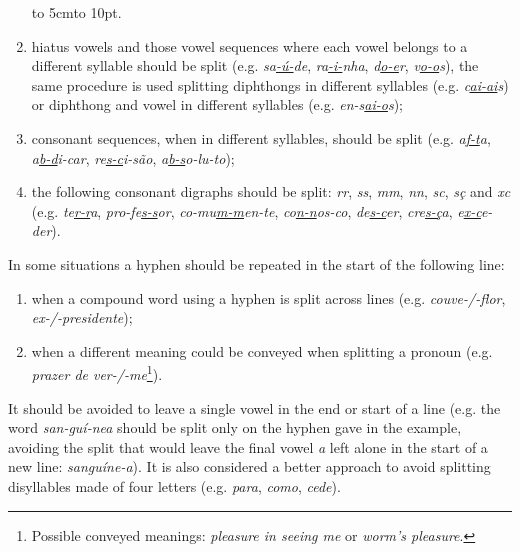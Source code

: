 \documentclass{article}
\begin{document}
\begin{enumerate}
    \hspace{10em} \hbox to 5cm{\leaders\hbox to 10pt{\hss . \hss}\hfil} 

    \item\label{rule-hiatus} hiatus vowels and those vowel sequences where each vowel
	belongs to a different syllable should be split (e.g.
	\emph{sa\underline{\emph{-ú-}}de}, \emph{ra\underline{\emph{-i-}}nha}, \emph{d\underline{\emph{o-e}}r},
	\emph{v\underline{\emph{o-o}}s}), the same procedure is used splitting diphthongs
	in different syllables (e.g. \emph{c\underline{\emph{ai-ai}}s}) or diphthong and
	vowel in different syllables (e.g. \emph{en-s\underline{\emph{ai-o}}s});
    \item\label{rule-consonants} consonant sequences, when in different syllables, should
	be split (e.g. \emph{a\underline{\emph{f-t}}a}, \emph{a\underline{\emph{b-d}}i-car},
	\emph{re\underline{\emph{s-c}}i-são}, \emph{a\underline{\emph{b-s}}o-lu-to});
    \item\label{rule-digraphs} the following consonant digraphs should be split:
	\emph{rr}, \emph{ss}, \emph{mm}, \emph{nn}, \emph{sc}, \emph{sç} and
	\emph{xc} (e.g. \emph{te\underline{\emph{r-r}}a}, \emph{pro-fe\underline{\emph{s-s}}or},
	\emph{co-mu\underline{\emph{m-m}}en-te}, \emph{co\underline{\emph{n-n}}os-co},
	\emph{de\underline{\emph{s-c}}er}, \emph{cre\underline{\emph{s-ç}}a}, \emph{e\underline{\emph{x-c}}e-der}).
\end{enumerate}


In some situations a hyphen should be repeated in the start of the following
line: 
\begin{enumerate}
\item when a compound word using a hyphen is split across lines (e.g.
    \emph{couve-/-flor}, \emph{ex-/-presidente});
\item when a different meaning could be conveyed when splitting a pronoun (e.g.
    \emph{prazer de ver-/-me}\footnote{Possible conveyed meanings: 
    \emph{pleasure in seeing me} or \emph{worm's pleasure}.}). 
\end{enumerate}

It should be avoided to leave a single vowel in the end or start of a line (e.g.
the word \emph{san-guí-nea} should be split only on the hyphen gave in the
example, avoiding the split that would leave the final vowel \emph{a}
left alone in the start of a new line: \emph{sanguíne-a}). It is also considered a better approach
to avoid splitting disyllables made of four letters (e.g. \emph{para},
\emph{como}, \emph{cede}).
\end{document}
